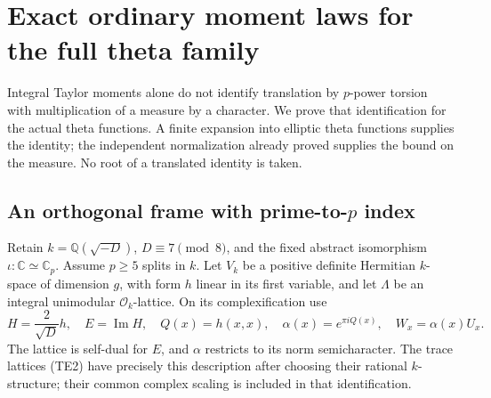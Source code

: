 \section{Exact ordinary moment laws for the full theta family}
\label{gm-section}

Integral Taylor moments alone do not identify translation by
$p$-power torsion with multiplication of a measure by a character.
We prove that identification for the actual theta functions.  A
finite expansion into elliptic theta functions supplies the
identity; the independent normalization already proved supplies
the bound on the measure.  No root of a translated identity is
taken.

\subsection{An orthogonal frame with prime-to-$p$ index}

Retain $k=\mathbb Q(\sqrt{-D})$, $D\equiv7\pmod8$, and the
fixed abstract isomorphism $\iota:\mathbb C\simeq\mathbb C_p$.
Assume $p\ge5$ splits in $k$.  Let $V_k$ be a positive definite
Hermitian $k$-space of dimension $g$, with form $h$ linear in its
first variable, and let $\Lambda$ be an integral unimodular
$\mathcal O_k$-lattice.  On its complexification use
\[
 H=\frac{2}{\sqrt D}h,\quad E=\operatorname{Im}H,\quad
 Q(x)=h(x,x),\quad \alpha(x)=e^{\pi iQ(x)},\quad
 W_x=\alpha(x)U_x.                                      \tag{GM1}
\]
The lattice is self-dual for $E$, and $\alpha$ restricts to
its norm semicharacter.  The trace lattices (TE2) have precisely
this description after choosing their rational $k$-structure;
their common complex scaling is included in that identification.

